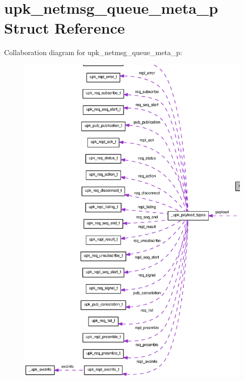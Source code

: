 \section{upk\_\-netmsg\_\-queue\_\-meta\_\-p Struct Reference}
\label{structupk__netmsg__queue__meta__p}


Collaboration diagram for upk\_\-netmsg\_\-queue\_\-meta\_\-p:
\nopagebreak
\begin{figure}[H]
\begin{center}
\leavevmode
\includegraphics[width=400pt]{structupk__netmsg__queue__meta__p__coll__graph}
\end{center}
\end{figure}
